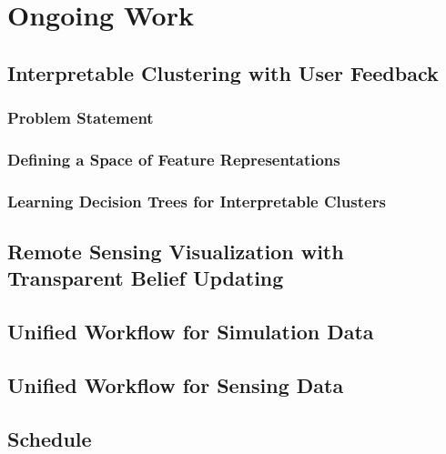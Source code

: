 \chapter{Ongoing Work}

\section{Interpretable Clustering with User Feedback}
\subsection{Problem Statement}
\subsection{Defining a Space of Feature Representations}
\subsection{Learning Decision Trees for Interpretable Clusters}

\section{Remote Sensing Visualization with Transparent Belief Updating}

\section{Unified Workflow for Simulation Data}

\section{Unified Workflow for Sensing Data}

\section{Schedule}